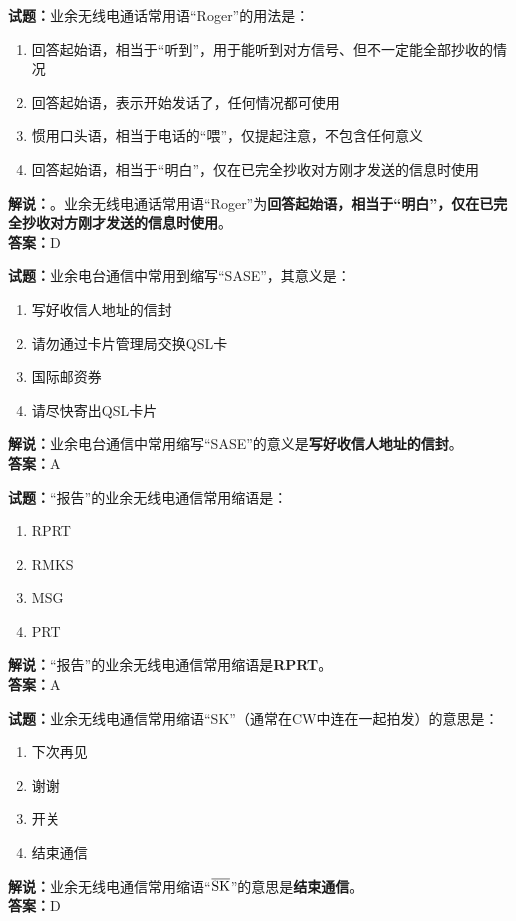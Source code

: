\documentclass{ctexbook}
\begin{document}
\bigskip


\noindent\textbf{试题：}业余无线电通话常用语“Roger”的用法是：
\begin{enumerate}[leftmargin=3em]
\item 回答起始语，相当于“听到”，用于能听到对方信号、但不一定能全部抄收的情况
\item 回答起始语，表示开始发话了，任何情况都可使用
\item 惯用口头语，相当于电话的“喂”，仅提起注意，不包含任何意义
\item 回答起始语，相当于“明白”，仅在已完全抄收对方刚才发送的信息时使用
\end{enumerate}
\noindent\textbf{解说：}。业余无线电通话常用语“Roger”为\textbf{回答起始语，相当于“明白”，仅在已完全抄收对方刚才发送的信息时使用}。\\\noindent\textbf{答案：}D


\bigskip


\noindent\textbf{试题：}业余电台通信中常用到缩写“SASE”，其意义是：
\begin{enumerate}[leftmargin=3em]
\item 写好收信人地址的信封
\item 请勿通过卡片管理局交换QSL卡
\item 国际邮资券
\item 请尽快寄出QSL卡片
\end{enumerate}
\noindent\textbf{解说：}业余电台通信中常用缩写“SASE”的意义是\textbf{写好收信人地址的信封}。\\\noindent\textbf{答案：}A



\bigskip


\noindent\textbf{试题：}“报告”的业余无线电通信常用缩语是：
\begin{enumerate}[leftmargin=3em]
\item RPRT
\item RMKS
\item MSG
\item PRT
\end{enumerate}
\noindent\textbf{解说：}“报告”的业余无线电通信常用缩语是\textbf{RPRT}。\\\noindent\textbf{答案：}A





\bigskip


\noindent\textbf{试题：}业余无线电通信常用缩语“SK”（通常在CW中连在一起拍发）的意思是：
\begin{enumerate}[leftmargin=3em]
\item 下次再见
\item 谢谢
\item 开关
\item 结束通信
\end{enumerate}
\noindent\textbf{解说：}业余无线电通信常用缩语“$\overline{\rm SK}$”的意思是\textbf{结束通信}。\\\noindent\textbf{答案：}D
\end{document}
